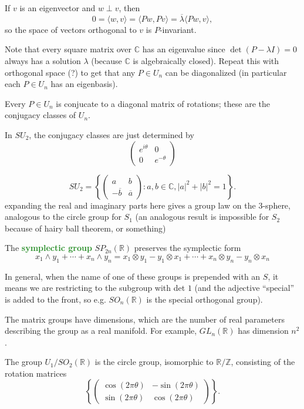 \documentclass[10pt]{scrartcl}
\providecommand{\ol}{\overline}
\providecommand{\CC}{\mathbb C}
\providecommand{\RR}{\mathbb R}
\providecommand{\ZZ}{\mathbb Z}
\providecommand{\vocab}[1]{{\textbf{\textcolor{ForestGreen}{#1}}}}
\begin{document}
If $v$ is an eigenvector and $w\perp v$, then
\[0 = \langle w,v\rangle = \langle Pw, Pv\rangle =
\ol\lambda\langle Pw,v\rangle,\]
so the space of vectors orthogonal to $v$ is $P$-invariant.

Note that every square matrix over $\CC$ has an eigenvalue
since $\det(P - \lambda I) = 0$ always has a solution $\lambda$
(because $\CC$ is algebraically closed).
Repeat this with orthogonal space (?) to get that any $P\in U_n$
can be diagonalized (in particular each $P\in U_n$ has an eigenbasis).

\begin{theorem}
	Every $P\in U_n$ is conjucate to a diagonal matrix of rotations;
	these are the conjugacy classes of $U_n$.
\end{theorem}

In $SU_2$, the conjugacy classes are just determined by
\[\begin{pmatrix}
	e^{i\theta} &0\\
	0&e^{-\theta}
\end{pmatrix}\]

\[SU_2 = \left\{\begin{pmatrix}
	a&b\\
	-\ol b&\ol a
\end{pmatrix} : a,b\in\CC, |a|^2 + |b|^2 = 1\right\}.\]
expanding the real and imaginary parts here gives a group law
on the $3$-sphere, analogous to the circle group for $S_1$
(an analogous result is impossible for $S_2$ because of
hairy ball theorem, or something)

\begin{definition}
	The \vocab{symplectic group} $SP_{2n}(\RR)$ preserves the
	symplectic form
	\[x_1\wedge y_1 + \cdots + x_n\wedge y_n =
	x_1\otimes y_1 - y_1\otimes x_1 + \cdots + x_n\otimes y_n - y_n\otimes x_n\]
\end{definition}


In general, when the name of one of these groups is prepended with an $S$,
it means we are restricting to the subgroup with det $1$
(and the adjective ``special'' is added to the front, so e.g.
$SO_n(\RR)$ is the special orthogonal group).

The matrix groups have dimensions, which are the number of
real parameters describing the group as a real manifold.
For example, $GL_n(\RR)$ has dimension $n^2$.

\begin{example}
	The group $U_1/ SO_2(\RR)$ is the circle group,
	isomorphic to $\RR/\ZZ$, consisting of the rotation matrices
	\[\left\{\begin{pmatrix}
		\cos(2\pi\theta) & -\sin(2\pi\theta)\\
		\sin(2\pi\theta) & \cos(2\pi\theta)
	\end{pmatrix}\right\}.\]
\end{example}
\end{document}

